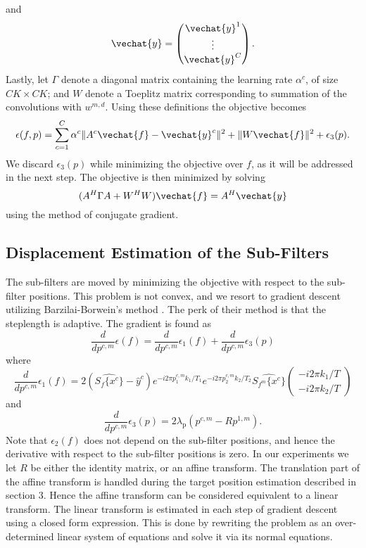 \documentclass[runningheads,a4paper]{llncs}
\begin{document}
and
\begin{equation}
  \vechat{y} = \begin{pmatrix}
    \vechat{y}^1\\
    \vdots\\
    \vechat{y}^C
  \end{pmatrix}.
\end{equation}
Lastly, let $\Gamma$ denote a diagonal matrix containing the learning rate $\alpha^c$, of size $CK\times CK$; and $W$ denote a Toeplitz matrix corresponding to summation of the convolutions with $w^{m,d}$. Using these definitions the objective becomes
\begin{equation}
  \epsilon(f,p) = \sum_{c=1}^C\alpha^c\|A^c\vechat{f} - \vechat{y}^c\|^2 + \|W\vechat{f}\|^2 + \epsilon_3(p).
\end{equation}
We discard $\epsilon_3(p)$ while minimizing the objective over $f$, as it will be addressed in the next step. The objective is then minimized by solving
\begin{equation}
  (A^H\Gamma A + W^HW)\vechat{f} = A^H\vechat{y}
\end{equation}
using the method of conjugate gradient.

\subsection{Displacement Estimation of the Sub-Filters}
The sub-filters are moved by minimizing the objective with respect to the sub-filter positions. This problem is not convex, and we resort to gradient descent utilizing Barzilai-Borwein's method \cite{barzilai1988two}. The perk of their method is that the steplength is adaptive. The gradient is found as
\begin{equation}
  \frac{d}{dp^{c,m}}\epsilon(f) = \frac{d}{dp^{c,m}}\epsilon_1(f) + \frac{d}{dp^{c,m}}\epsilon_3(p)
\end{equation}
where
\begin{equation}
  \frac{d}{dp^{c,m}}\epsilon_1(f) = 2(\widehat{S_f\{x^c\}}-\hat{y}^c)e^{-i2\pi p_1^{c,m}k_1/T_1}e^{-i2\pi p_2^{c,m}k_2/T_2}\widehat{S_{f^m}\{x^c\}}\begin{pmatrix}
    -i2\pi k_1/T\\
    -i2\pi k_2/T
  \end{pmatrix}
\end{equation}
and
\begin{equation}
  \frac{d}{dp^{c,m}}\epsilon_3(p) = 2\lambda_{\text{p}}(p^{c,m} - Rp^{1,m}).
\end{equation}
Note that $\epsilon_2(f)$ does not depend on the sub-filter positions, and hence the derivative with respect to the sub-filter positions is zero. In our experiments we let $R$ be either the identity matrix, or an affine transform. The translation part of the affine transform is handled during the target position estimation described in section 3. Hence the affine transform can be considered equivalent to a linear transform. The linear transform is estimated in each step of gradient descent using a closed form expression. This is done by rewriting the problem as an over-determined linear system of equations and solve it via its normal equations.
\end{document}
